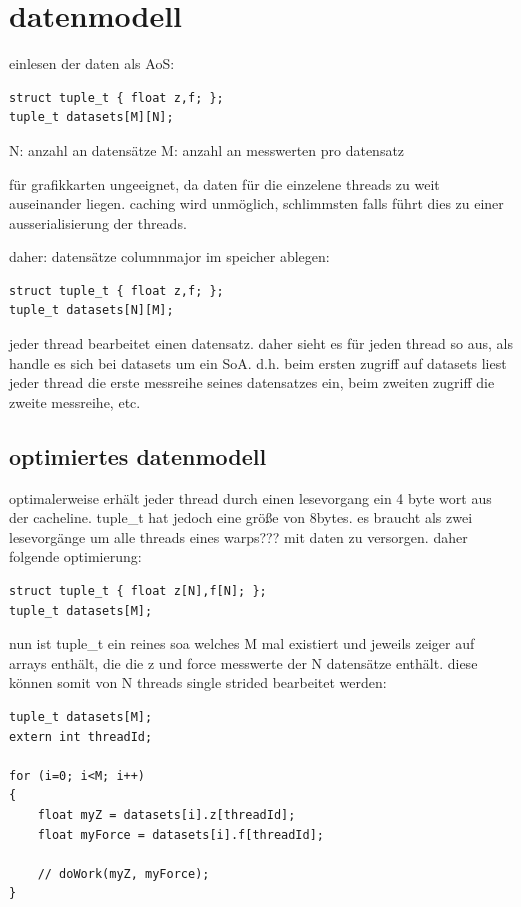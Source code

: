 \section{datenmodell}
einlesen der daten als AoS:

\begin{lstlisting}
struct tuple_t { float z,f; };
tuple_t datasets[M][N];
\end{lstlisting}

N: anzahl an datensätze
M: anzahl an messwerten pro datensatz

für grafikkarten ungeeignet, da daten für die einzelene threads zu weit auseinander liegen. caching wird unmöglich, schlimmsten falls führt dies zu einer ausserialisierung der threads.

daher: datensätze columnmajor im speicher ablegen:

\begin{lstlisting}
struct tuple_t { float z,f; };
tuple_t datasets[N][M];
\end{lstlisting}

jeder thread bearbeitet einen datensatz. daher sieht es für jeden thread so aus, als handle es sich bei datasets um ein SoA. d.h. beim ersten zugriff auf datasets liest jeder thread die erste messreihe seines datensatzes ein, beim zweiten zugriff die zweite messreihe, etc.

\subsection{optimiertes datenmodell}
optimalerweise erhält jeder thread durch einen lesevorgang ein 4 byte wort aus der cacheline. tuple\_t hat jedoch eine größe von 8bytes. es braucht als zwei lesevorgänge um alle threads eines warps??? mit daten zu versorgen.
daher folgende optimierung:

\begin{lstlisting}
struct tuple_t { float z[N],f[N]; };
tuple_t datasets[M];
\end{lstlisting}

nun ist tuple\_t ein reines soa welches M mal existiert und jeweils zeiger auf arrays enthält, die die z und force messwerte der N datensätze enthält. diese können somit von N threads single strided bearbeitet werden:

\begin{lstlisting}
tuple_t datasets[M];
extern int threadId;

for (i=0; i<M; i++)
{
    float myZ = datasets[i].z[threadId];
    float myForce = datasets[i].f[threadId];
    
    // doWork(myZ, myForce);
}
\end{lstlisting}

